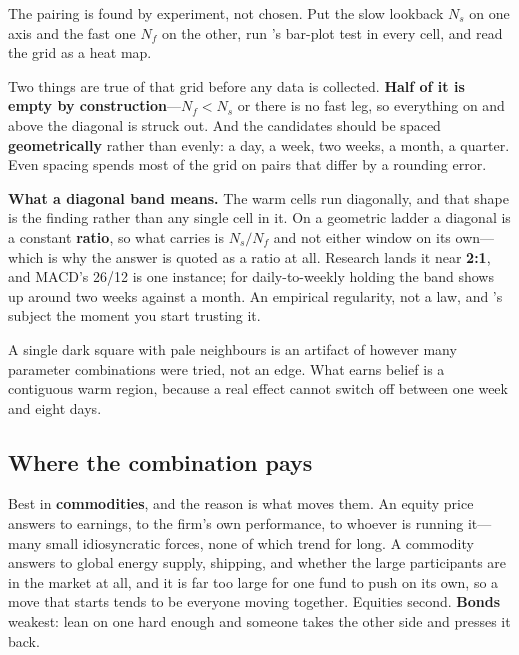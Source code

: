 The pairing is found by experiment, not chosen. Put the slow lookback $N_s$ on one axis and the fast
one $N_f$ on the other, run 's bar-plot test in every cell, and read
the grid as a heat map.


Two things are true of that grid before any data is collected. \textbf{Half of it is empty by
construction}---$N_f < N_s$ or there is no fast leg, so everything on and above the diagonal is
struck out. And the candidates should be spaced \textbf{geometrically} rather than evenly: a day, a
week, two weeks, a month, a quarter. Even spacing spends most of the grid on pairs that differ by a
rounding error.

\textbf{What a diagonal band means.} The warm cells run diagonally, and that shape is the finding
rather than any single cell in it. On a geometric ladder a diagonal is a constant \textbf{ratio}, so
what carries is $N_s / N_f$ and not either window on its own---which is why the answer is quoted as
a ratio at all. Research lands it near \textbf{2:1}, and MACD's 26/12 is one instance; for
daily-to-weekly holding the band shows up around two weeks against a month. An empirical
regularity, not a law, and 's subject the moment you
start trusting it.

\begin{note}
A single dark square with pale neighbours is an artifact of however many parameter combinations were
tried, not an edge. What earns belief is a contiguous warm region, because a real effect cannot
switch off between one week and eight days.
\end{note}

\subsection{Where the combination pays}\label{sec:where-it-pays}

Best in \textbf{commodities}, and the reason is what moves them. An equity price answers to
earnings, to the firm's own performance, to whoever is running it---many small idiosyncratic forces,
none of which trend for long. A commodity answers to global energy supply, shipping, and whether the
large participants are in the market at all, and it is far too large for one fund to push on its
own, so a move that starts tends to be everyone moving together. Equities second. \textbf{Bonds}
weakest: lean on one hard enough and someone takes the other side and presses it back.


